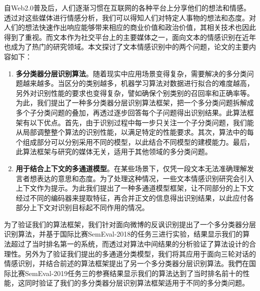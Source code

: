 \begin{cabstract}

自Web2.0普及后，人们逐渐习惯在互联网的各种平台上分享他们的想法和情感。透过对这些媒体进行情感分析，我们可以得知人们对特定人事物的想法和态度。对人们的想法快速作出响应能够带来相应的商业价值和政治价值，其相关技术也因此得到了重视。而文本作为社交平台上的主要媒体之一，面向文本的情感识别在近年也成为了热门的研究领域。本文探讨了文本情感识别中的两个问题，论文的主要内容如下：

\begin{enumerate}

\item {\bf 多分类器分层识别算法}。随着现实中应用场景变得复杂，需要解决的多分类问题越来越多。当区分的类别越多，机器学习算法对数据进行拟合的难度越高，另外对识别性能的要求也变得复杂，譬如确保个别类别的召回率和正确率等。为此，我们提出了一种多分类器分层识别算法框架，把一个多分类问题拆解成多个子分类问题的叠加，再透过逐步回答每个子问题得出识别结果。此算法框架有以下优点。首先，由于识别过程中每一步只关注一个子分类问题，我们能从局部调整整个算法的识别性能，以满足特定的性能要求。其次，算法中的每个组成部分可以分别采用不同的模型，以此结合不同模型的建模能力。最后，此算法框架与研究的媒体无关，适用于其他领域的多分类问题。

\item {\bf 用于结合上下文的多通道模型}。在某些场景下，仅凭一段文本无法准确理解发言者想表达的意思和态度。为了处理这种情况，一些文本情感识别研究会引入上下文作为提示。为此我们提出了一种多通道模型框架，让不同部分的上下文经过不同的编码器来提取特征，再合并正文的信息得出识别结果，以此应付各部分上下文对识别目标起不同作用的情况。

\end{enumerate}

为了验证我们的算法框架，我们针对面向微博的反讽识别提出了一个多分类器分层识别算法，并基于国际比赛SemEval-2018的任务三进行实验，结果显示我们的算法超过了当时排名第一的系统，而透过对算法中间结果的分析验证了算法设计的合理性。另外为了验证我们提出的多通道分类模型，我们将其应用于面向三轮对话的情感识别，并结合前述的算法框架提出了另一个多分类器分层识别算法。我們在国际比赛SemEval-2019任务三的参赛结果显示我们的算法达到了当时排名前十的性能，这同时验证了我们的多分类器分层识别算法框架适用于不同的多分类问题。


\end{cabstract}


